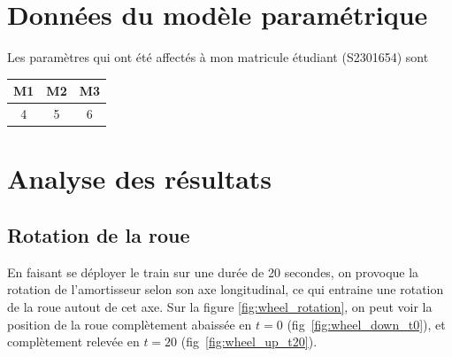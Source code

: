 \documentclass{article}
\begin{document}
\newpage

\newpage
\section{Données du modèle paramétrique}
Les paramètres qui ont été affectés à mon matricule étudiant (S2301654) sont
\begin{center}
    \begin{tabular}{|c|c|c|}
        \hline
        M1 & M2 & M3\\
        \hline
        4 & 5 & 6\\
        \hline
    \end{tabular}
\end{center}

\section{Analyse des résultats}
\subsection{Rotation de la roue}

En faisant se déployer le train sur une durée de 20 secondes, on provoque la rotation de l'amortisseur selon son axe longitudinal, ce qui entraine une rotation de la roue autout de cet axe. Sur la figure \ref{fig:wheel_rotation}, on peut voir la position de la roue complètement abaissée en \(t = 0\) (fig~\ref{fig:wheel_down_t0}), et complètement relevée en \(t=20\) (fig~\ref{fig:wheel_up_t20}).
\end{document}
